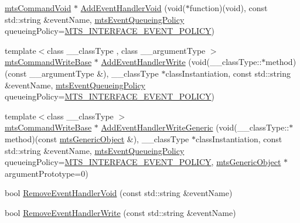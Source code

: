 \begin{DoxyCompactItemize}
\item 
\hyperlink{classmts_command_void}{mts\+Command\+Void} $\ast$ \hyperlink{classmts_interface_required_a631bc74359f27ef1a3ef07e39d57c25e}{Add\+Event\+Handler\+Void} (void($\ast$function)(void), const std\+::string \&event\+Name, \hyperlink{mts_forward_declarations_8h_a9286ac2ca46e5bcd57059550faa96916}{mts\+Event\+Queueing\+Policy} queueing\+Policy=\hyperlink{mts_forward_declarations_8h_a9286ac2ca46e5bcd57059550faa96916a3d4338e85690d50e9ab167be77cdefa0}{M\+T\+S\+\_\+\+I\+N\+T\+E\+R\+F\+A\+C\+E\+\_\+\+E\+V\+E\+N\+T\+\_\+\+P\+O\+L\+I\+C\+Y})
\item 
{\footnotesize template$<$class \+\_\+\+\_\+class\+Type , class \+\_\+\+\_\+argument\+Type $>$ }\\\hyperlink{classmts_command_write_base}{mts\+Command\+Write\+Base} $\ast$ \hyperlink{classmts_interface_required_a5259260a2f54575de9bbe8b2636430b8}{Add\+Event\+Handler\+Write} (void(\+\_\+\+\_\+class\+Type\+::$\ast$method)(const \+\_\+\+\_\+argument\+Type \&), \+\_\+\+\_\+class\+Type $\ast$class\+Instantiation, const std\+::string \&event\+Name, \hyperlink{mts_forward_declarations_8h_a9286ac2ca46e5bcd57059550faa96916}{mts\+Event\+Queueing\+Policy} queueing\+Policy=\hyperlink{mts_forward_declarations_8h_a9286ac2ca46e5bcd57059550faa96916a3d4338e85690d50e9ab167be77cdefa0}{M\+T\+S\+\_\+\+I\+N\+T\+E\+R\+F\+A\+C\+E\+\_\+\+E\+V\+E\+N\+T\+\_\+\+P\+O\+L\+I\+C\+Y})
\item 
{\footnotesize template$<$class \+\_\+\+\_\+class\+Type $>$ }\\\hyperlink{classmts_command_write_base}{mts\+Command\+Write\+Base} $\ast$ \hyperlink{classmts_interface_required_a07e4e7e34e64cdb2fed11147b3e33293}{Add\+Event\+Handler\+Write\+Generic} (void(\+\_\+\+\_\+class\+Type\+::$\ast$method)(const \hyperlink{classmts_generic_object}{mts\+Generic\+Object} \&), \+\_\+\+\_\+class\+Type $\ast$class\+Instantiation, const std\+::string \&event\+Name, \hyperlink{mts_forward_declarations_8h_a9286ac2ca46e5bcd57059550faa96916}{mts\+Event\+Queueing\+Policy} queueing\+Policy=\hyperlink{mts_forward_declarations_8h_a9286ac2ca46e5bcd57059550faa96916a3d4338e85690d50e9ab167be77cdefa0}{M\+T\+S\+\_\+\+I\+N\+T\+E\+R\+F\+A\+C\+E\+\_\+\+E\+V\+E\+N\+T\+\_\+\+P\+O\+L\+I\+C\+Y}, \hyperlink{classmts_generic_object}{mts\+Generic\+Object} $\ast$argument\+Prototype=0)
\item 
bool \hyperlink{classmts_interface_required_aade550860b428236c9505550d1476c03}{Remove\+Event\+Handler\+Void} (const std\+::string \&event\+Name)
\item 
bool \hyperlink{classmts_interface_required_a3874cddc209b1dde7f52c9dd4d5933a4}{Remove\+Event\+Handler\+Write} (const std\+::string \&event\+Name)
\end{DoxyCompactItemize}
